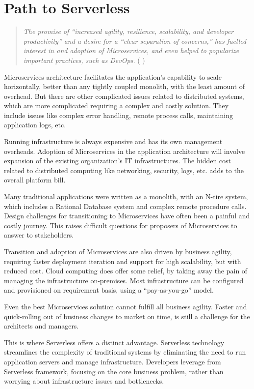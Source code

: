 \documentclass{article}
\begin{document}
\section{Path to Serverless}
\begin{quote}
    \textit{The promise of “increased agility, resilience, scalability, and developer productivity” and a desire for a “clear separation of concerns,” has fuelled interest in and adoption of Microservices, and even helped to popularize important practices, such as DevOps.}  ( \cite{KillaleaTom-2016} )
\end{quote}
\begin{flushleft}
Microservices architecture facilitates the application’s capability to scale horizontally, better than any tightly coupled monolith, with the least amount of overhead. But there are other complicated issues related to distributed systems, which are more complicated requiring a complex and costly solution. They include issues like complex error handling, remote process calls, maintaining application logs, etc.

Running infrastructure is always expensive and has its own management overheads. Adoption of Microservices in the application architecture will involve expansion of the existing organization’s IT infrastructures. The hidden cost related to distributed computing like networking, security, logs, etc. adds to the overall platform bill.

Many traditional applications were written as a monolith, with an N-tire system, which includes a Rational Database system and complex remote procedure calls. Design challenges for transitioning to Microservices have often been a painful and costly journey. This raises difficult questions for proposers of Microservices to answer to stakeholders.

Transition and adoption of Microservices are also driven by business agility, requiring faster deployment iteration and support for high scalability, but with reduced cost. 
Cloud computing does offer some relief, by taking away the pain of managing the infrastructure on-premises. Most infrastructure can be configured and provisioned on requirement basis, using a “pay-as-you-go” model. 

Even the best Microservices solution cannot fulfill all business agility. Faster and quick-rolling out of business changes to market on time, is still a challenge for the architects and managers. 

This is where Serverless offers a distinct advantage. Serverless technology streamlines the complexity of traditional systems by eliminating the need to run application servers and manage infrastructure. Developers leverage from Serverless framework, focusing on the core business problem, rather than worrying about infrastructure issues and bottlenecks.


\end{flushleft}
\end{document}
